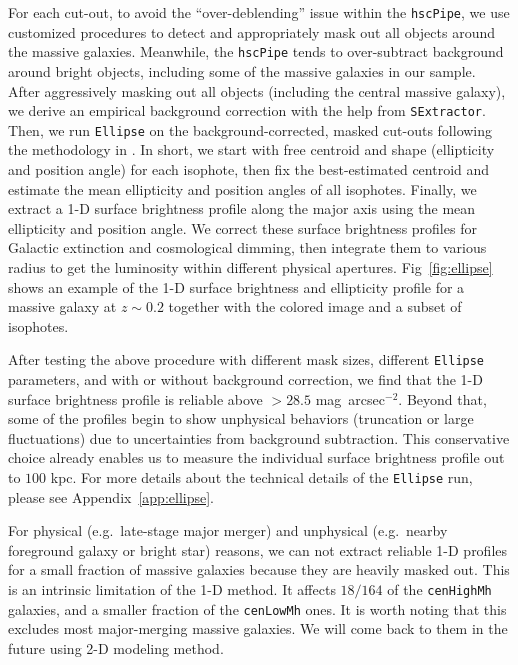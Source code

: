 \documentclass[a4paper,fleqn,usenatbib]{mnras}
\def\sb{mag~arcsec$^{-2}$}
\def\rbcg{\texttt{cenHighMh}}
\def\nbcg{\texttt{cenLowMh}}
\begin{document}
    For each cut-out, to avoid the ``over-deblending'' issue within the 
    \texttt{hscPipe}, we use customized procedures to detect and appropriately mask 
    out all objects around the massive galaxies.
    Meanwhile, the \texttt{hscPipe} tends to over-subtract background around bright
    objects, including some of the massive galaxies in our sample. 
    After aggressively masking out all objects (including the central massive 
    galaxy), we derive an empirical background correction with the help from 
    \texttt{SExtractor}.
    Then, we run \texttt{Ellipse} on the background-corrected, masked cut-outs 
    following the methodology in \citep{Li2012}. 
    In short, we start with free centroid and shape (ellipticity and position angle) 
    for each isophote, then fix the best-estimated centroid and estimate the mean 
    ellipticity and position angles of all isophotes.  
    Finally, we extract a 1-D surface brightness profile along the major axis using 
    the mean ellipticity and position angle. 
    We correct these surface brightness profiles for Galactic extinction and 
    cosmological dimming, then integrate them to various radius to get the 
    luminosity within different physical apertures. 
    Fig~\ref{fig:ellipse} shows an example of the 1-D surface brightness and 
    ellipticity profile for a massive galaxy at $z\sim0.2$ together with the 
    colored image and a subset of isophotes.    

    After testing the above procedure with different mask sizes, different 
    \texttt{Ellipse} parameters, and with or without background correction, 
    we find that the 1-D surface brightness profile is reliable above 
    $>28.5$ \sb. 
    Beyond that, some of the profiles begin to show unphysical behaviors 
    (truncation or large fluctuations) due to uncertainties from background subtraction. 
    This conservative choice already enables us to measure the individual surface 
    brightness profile out to $100$ kpc. 
    For more details about the technical details of the \texttt{Ellipse} run, please 
    see Appendix~\ref{app:ellipse}.
    
    For physical (e.g.\ late-stage major merger) and unphysical (e.g.\ nearby foreground 
    galaxy or bright star) reasons, we can not extract reliable 1-D profiles for a small 
    fraction of massive galaxies because they are heavily masked out. 
    This is an intrinsic limitation of the 1-D method. 
    It affects $18/164$ of the \rbcg{} galaxies, and a smaller fraction of the \nbcg{} 
    ones. 
    It is worth noting that this excludes most major-merging massive galaxies. 
    We will come back to them in the future using 2-D modeling method.
    
\end{document}
